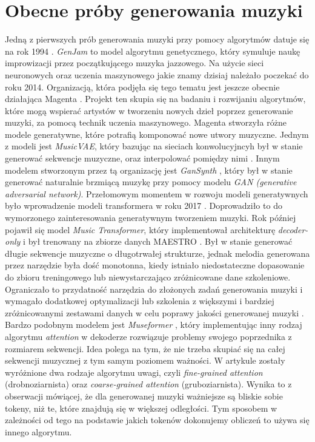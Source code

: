 \documentclass[data-science]{agh-wi} %
\begin{document}
\section{Obecne próby generowania muzyki}
Jedną z pierwszych prób generowania muzyki przy pomocy algorytmów datuje się na rok 1994 \cite{GenJam}. \textit{GenJam} to model algorytmu genetycznego, który symuluje naukę improwizacji przez początkującego muzyka jazzowego. Na użycie sieci neuronowych oraz uczenia maszynowego jakie znamy dzisiaj należało poczekać do roku 2014. Organizacją, która podjęła się tego tematu jest jeszcze obecnie działająca Magenta \cite*{magenta}. Projekt ten skupia się na badaniu i rozwijaniu algorytmów, które mogą wspierać artystów w tworzeniu nowych dzieł poprzez generowanie muzyki, za pomocą technik uczenia maszynowego. Magenta stworzyła różne modele generatywne, które potrafią komponować nowe utwory muzyczne. Jednym z modeli jest \textit{MusicVAE}, który bazując na sieciach konwolucyjncyh był w stanie generować sekwencje muzyczne, oraz interpolować pomiędzy nimi \cite*{musicvae}. Innym modelem stworzonym przez tą organizację jest \textit{GanSynth} \cite*{engel2018gansynth}, który był w stanie generować naturalnie brzmiącą muzykę przy pomocy modelu \textit{GAN (generative adversarial network)}. Przełomowym momentem w rozwoju modeli generatywnych było wprowadzenie modeli transformera w roku 2017 \cite*{attention}. Doprowadziło to do wymorzonego zainteresowania generatywnym tworzeniem muzyki. Rok później pojawił się model \textit{Music Transformer}, który implementował architekturę \textit{decoder-only} i był trenowany na zbiorze danych MAESTRO \cite*{huang2018music}. Był w stanie generować długie sekwencje muzyczne o długotrwałej strukturze, jednak melodia generowana przez narzędzie była dość monotonna, kiedy istniało niedostateczne dopasowanie do zbioru treningowego lub niewystarczająco zróżnicowane dane szkoleniowe. Ograniczało to przydatność narzędzia do złożonych zadań generowania muzyki i wymagało dodatkowej optymalizacji lub szkolenia z większymi i bardziej zróżnicowanymi zestawami danych w celu poprawy jakości generowanej muzyki \cite*{zhu2023survey}. Bardzo podobnym modelem jest \textit{Museformer} \cite*{yu2022museformer}, który implementując inny rodzaj algorytmu \textit{attention} w dekoderze rozwiązuje problemy swojego poprzednika z rozmiarem sekwencji. Idea polega na tym, że nie trzeba skupiać się na całej sekwencji muzycznej z tym samym poziomem ważności. W artykule zostały wyróżnione dwa rodzaje algorytmu uwagi, czyli \textit{fine-grained attention} (drobnoziarnista) oraz \textit{coarse-grained attention} (gruboziarnista). Wynika to z obserwacji mówiącej, że dla generowanej muzyki ważniejsze są bliskie sobie tokeny, niż te, które znajdują się w większej odległości. Tym sposobem w zależności od tego na podstawie jakich tokenów dokonujemy obliczeń to używa się innego algorytmu.
\end{document}
